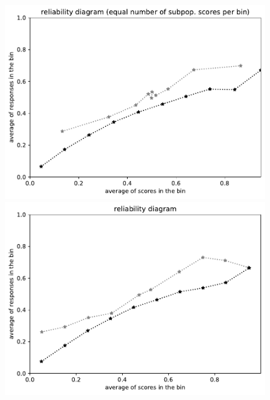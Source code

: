 \documentclass{article}
\newlength{\vertsep}
\newlength{\imsize}
\begin{document}
\begin{figure}
\begin{centering}
\parbox{\imsize}{\includegraphics[width=\imsize]
{../codes/unweighted/10000_7000_10_0/equisamps.pdf}}
\quad\quad
\parbox{\imsize}{\includegraphics[width=\imsize]
{../codes/unweighted/10000_7000_10_0/equiscore.pdf}}

\vspace{\vertsep}


\end{centering}
\end{figure}
\end{document}
